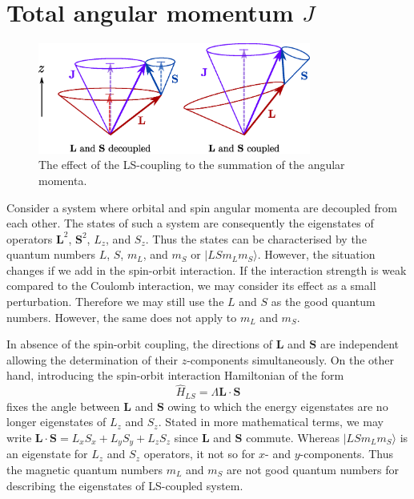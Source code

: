 \section{Total angular momentum $J$}
\begin{figure}[ht!]
\centering
\includegraphics[width=0.8\textwidth]{magnetism/figures/angular_momenta_sums}
\caption{The effect of the LS-coupling to the summation of the angular momenta.\label{fig:angular_momenta_sums}}
\end{figure}

Consider a system where orbital and spin angular momenta are decoupled from each other. The states of such a system are consequently the eigenstates of operators $\mathbf{L}^2$, $\mathbf{S}^2$, $L_z$, and  $S_z$. Thus the states can be characterised by the quantum numbers $L$, $S$, $m_L$, and $m_S$  or $|LSm_Lm_S\rangle$. 
However, the situation changes if we add in the spin-orbit interaction. If the interaction strength is weak compared to the Coulomb interaction, we may consider its effect as a small perturbation. Therefore we may still use the $L$ and $S$ as the good quantum numbers. However, the same does not apply to $m_L$ and $m_S$. 

In absence of the spin-orbit coupling, the directions of $\mathbf{L}$ and $\mathbf{S}$ are independent allowing the determination of their $z$-components  simultaneously. On the other hand, introducing the spin-orbit interaction Hamiltonian of the form
\begin{equation}
\hat{H}_{LS} = \Lambda \mathbf{L}\cdot\mathbf{S}
\end{equation}
fixes the angle between $\mathbf{L}$ and $\mathbf{S}$ owing to which the energy eigenstates are no longer eigenstates of $L_z$ and $S_z$. Stated in more mathematical terms, we may write $\mathbf{L} \cdot \mathbf{S} = L_x S_x + L_y S_y + L_z S_z$ since $\mathbf{L}$ and $\mathbf{S}$ commute. Whereas $|LSm_Lm_S\rangle$ is an eigenstate for $L_z$ and $S_z$ operators, it not so for $x$- and $y$-components. Thus the magnetic quantum numbers $m_L$ and $m_S$ are not good quantum numbers for describing the eigenstates of LS-coupled system.


